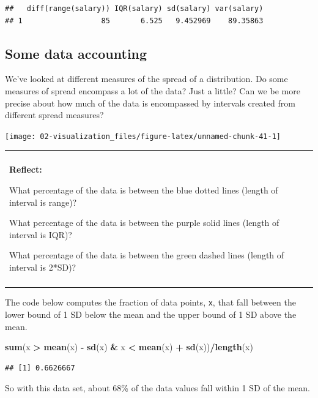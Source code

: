 \documentclass[
]{book}
\newenvironment{Shaded}{\begin{snugshade}}{\end{snugshade}}
\newcommand{\KeywordTok}[1]{\textcolor[rgb]{0.13,0.29,0.53}{\textbf{#1}}}
\newcommand{\NormalTok}[1]{#1}
\newcommand{\OperatorTok}[1]{\textcolor[rgb]{0.81,0.36,0.00}{\textbf{#1}}}
\newcommand{\StringTok}[1]{\textcolor[rgb]{0.31,0.60,0.02}{#1}}
\newenvironment{reflect}
{
    \begin{center}
    
    \begin{tabular}{|p{0.8\textwidth}|}
    \rowcolor{LightBlue}
    \hline\\
    \rowcolor{LightBlue}
    \textbf{Reflect:}
}
{
    \\\rowcolor{LightBlue}
    \\\hline
    \end{tabular} 
    \end{center}
}
\begin{document}
\begin{verbatim}
##   diff(range(salary)) IQR(salary) sd(salary) var(salary)
## 1                  85       6.525   9.452969    89.35863
\end{verbatim}

\hypertarget{intro-zscore}{%
\subsection{Some data accounting}\label{intro-zscore}}

We've looked at different measures of the spread of a distribution. Do some measures of spread encompass a lot of the data? Just a little? Can we be more precise about how much of the data is encompassed by intervals created from different spread measures?

\begin{center}\texttt{[image: 02-visualization\_files/figure-latex/unnamed-chunk-41-1]} \end{center}

\begin{reflect}
What percentage of the data is between the blue dotted lines (length of
interval is range)?

What percentage of the data is between the purple solid lines (length of
interval is IQR)?

What percentage of the data is between the green dashed lines (length of
interval is 2*SD)?
\end{reflect}

The code below computes the fraction of data points, \texttt{x}, that fall between the lower bound of 1 SD below the mean and the upper bound of 1 SD above the mean.

\begin{Shaded}
\begin{Highlighting}[]
\KeywordTok{sum}\NormalTok{(x }\OperatorTok{>}\StringTok{ }\KeywordTok{mean}\NormalTok{(x) }\OperatorTok{-}\StringTok{ }\KeywordTok{sd}\NormalTok{(x) }\OperatorTok{&}\StringTok{ }\NormalTok{x }\OperatorTok{<}\StringTok{ }\KeywordTok{mean}\NormalTok{(x) }\OperatorTok{+}\StringTok{ }\KeywordTok{sd}\NormalTok{(x))}\OperatorTok{/}\KeywordTok{length}\NormalTok{(x)}
\end{Highlighting}
\end{Shaded}

\begin{verbatim}
## [1] 0.6626667
\end{verbatim}

So with this data set, about 68\% of the data values fall within 1 SD of the mean.
\end{document}
